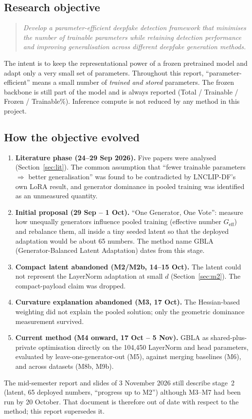 \documentclass[10pt,a4paper]{article}
\begin{document}
\subsection{Research objective}
\begin{quote}
\emph{Develop a parameter-efficient deepfake detection framework that minimises the number of
trainable parameters while retaining detection performance and improving generalisation across
different deepfake generation methods.}
\end{quote}
The intent is to keep the representational power of a frozen pretrained model and adapt only a
very small set of parameters. Throughout this report, ``parameter-efficient'' means a small number
of \emph{trained and stored} parameters. The frozen backbone is still part of the model and is
always reported (Total / Trainable / Frozen / Trainable\%). Inference compute is not reduced by
any method in this project.

\subsection{How the objective evolved}\label{sec:evolution-short}
\begin{enumerate}
\item \textbf{Literature phase (24--29 Sep 2026).} Five papers were analysed (Section~\ref{sec:lit}).
The common assumption that ``fewer trainable parameters \(\Rightarrow\) better generalisation'' was
found to be contradicted by LNCLIP-DF's own LoRA result, and generator dominance in pooled training
was identified as an unmeasured quantity.
\item \textbf{Initial proposal (29 Sep -- 1 Oct).} ``One Generator, One Vote'': measure how unequally
generators influence pooled training (effective number \(G_\text{eff}\)) and rebalance them, all
inside a tiny seeded latent so that the deployed adaptation would be about 65 numbers. The method
name GBLA (Generator-Balanced Latent Adaptation) dates from this stage.
\item \textbf{Compact latent abandoned (M2/M2b, 14--15 Oct).} The latent could not represent the
LayerNorm adaptation at small \(d\) (Section~\ref{sec:m2}). The compact-payload claim was dropped.
\item \textbf{Curvature explanation abandoned (M3, 17 Oct).} The Hessian-based weighting did not
explain the pooled solution; only the geometric dominance measurement survived.
\item \textbf{Current method (M4 onward, 17 Oct -- 5 Nov).} GBLA as shared-plus-private
optimisation directly on the 104,450 LayerNorm and head parameters, evaluated by
leave-one-generator-out (M5), against merging baselines (M6), and across datasets (M8b, M9b).
\end{enumerate}
The mid-semester report and slides of 3 November 2026 still describe stage~2 (latent,
65 deployed numbers, ``progress up to M2'') although M3--M7 had been run by 20 October. That
document is therefore out of date with respect to the method; this report supersedes it.
\end{document}
